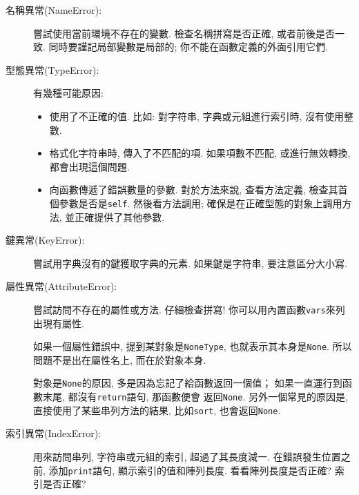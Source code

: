 \documentclass[10pt]{book}
\begin{document}
\begin{description}

\item[名稱異常(NameError):] 嘗試使用當前環境不存在的變數. 
檢查名稱拼寫是否正確, 或者前後是否一致. 
同時要謹記局部變數是局部的; 你不能在函數定義的外面引用它們.

\item[型態異常(TypeError):] 有幾種可能原因:

\begin{itemize}

\item  使用了不正確的值. 比如: 對字符串, 字典或元組進行索引時, 沒有使用整數. 

\item 格式化字符串時, 傳入了不匹配的項. 
如果項數不匹配, 或進行無效轉換, 都會出現這個問題. 

\item 向函數傳遞了錯誤數量的參數. 對於方法來說, 查看方法定義, 
檢查其首個參數是否是{\tt self}.
然後看方法調用; 確保是在正確型態的對象上調用方法, 
並正確提供了其他參數. 

\end{itemize}

\item[鍵異常(KeyError):]  嘗試用字典沒有的鍵獲取字典的元素. 
如果鍵是字符串, 要注意區分大小寫. 

\item[屬性異常(AttributeError):] 嘗試訪問不存在的屬性或方法. 
仔細檢查拼寫! 你可以用內置函數{\tt vars}來列出現有屬性. 

如果一個屬性錯誤中, 提到某對象是{\tt NoneType},
也就表示其本身是{\tt None}.
所以問題不是出在屬性名上, 而在於對象本身. 

對象是{\tt None}的原因, 多是因為忘記了給函數返回一個值；
如果一直運行到函數末尾, 都沒有{\tt return}語句, 那函數便會
返回{\tt None}. 
另外一個常見的原因是, 直接使用了某些串列方法的結果, 比如{\tt sort}, 
也會返回{\tt None}.

\item[索引異常(IndexError):] 用來訪問串列, 字符串或元組的索引, 超過了其長度減一. 
在錯誤發生位置之前, 添加{\tt print}語句, 顯示索引的值和陣列長度. 
看看陣列長度是否正確? 索引是否正確?

\end{description}
\end{document}

